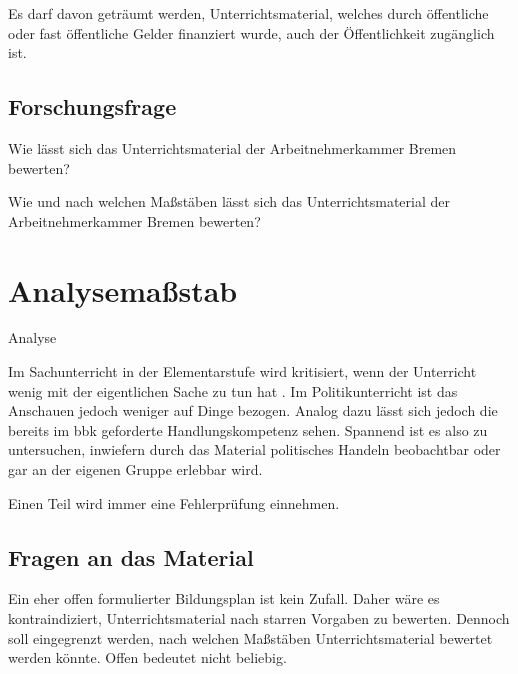 Es darf davon geträumt werden, Unterrichtsmaterial, welches durch öffentliche oder fast öffentliche Gelder finanziert wurde, auch der Öffentlichkeit zugänglich ist.

\subsection{Forschungsfrage}
Wie lässt sich das Unterrichtsmaterial der Arbeitnehmerkammer Bremen bewerten?

Wie und nach welchen Maßstäben lässt sich das Unterrichtsmaterial der Arbeitnehmerkammer Bremen bewerten?

\section{Analysemaßstab}
Analyse

Im Sachunterricht in der Elementarstufe wird kritisiert, wenn der Unterricht wenig mit der eigentlichen Sache zu tun hat \autocite[2-4]{Scholz2004}. Im Politikunterricht ist das Anschauen jedoch weniger auf Dinge bezogen. Analog dazu lässt sich jedoch die bereits im \gls{bbk} geforderte Handlungskompetenz sehen. Spannend ist es also zu untersuchen, inwiefern durch das Material politisches Handeln beobachtbar oder gar an der eigenen Gruppe erlebbar wird.




Einen Teil wird immer eine Fehlerprüfung einnehmen. 

\subsection{Fragen an das Material} %
Ein eher offen formulierter Bildungsplan ist kein Zufall. %
Daher wäre es kontraindiziert, Unterrichtsmaterial nach starren Vorgaben zu bewerten.
Dennoch soll eingegrenzt werden, nach welchen Maßstäben Unterrichtsmaterial bewertet werden könnte. Offen bedeutet nicht beliebig.

